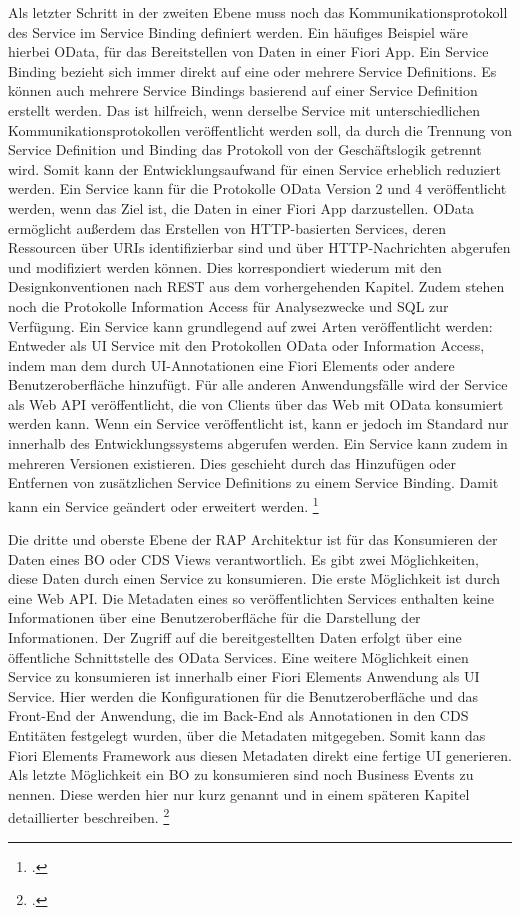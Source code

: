 Als letzter Schritt in der zweiten Ebene muss noch das Kommunikationsprotokoll des Service im Service Binding definiert werden. Ein häufiges Beispiel wäre hierbei OData, für das Bereitstellen von Daten in einer Fiori App. Ein Service Binding bezieht sich immer direkt auf eine oder mehrere Service Definitions. Es können auch mehrere Service Bindings basierend auf einer Service Definition erstellt werden. Das ist \zB hilfreich, wenn derselbe Service mit unterschiedlichen Kommunikationsprotokollen veröffentlicht werden soll, da durch die Trennung von Service Definition und Binding das Protokoll von der Geschäftslogik getrennt wird. Somit kann der Entwicklungsaufwand für einen Service erheblich reduziert werden. Ein Service kann für die Protokolle OData Version 2 und 4 veröffentlicht werden, wenn das Ziel ist, die Daten in einer Fiori App darzustellen. OData ermöglicht au{\ss}erdem das Erstellen von HTTP-basierten Services, deren Ressourcen über URIs identifizierbar sind und über HTTP-Nachrichten abgerufen und modifiziert werden können. Dies korrespondiert wiederum mit den Designkonventionen nach REST aus dem vorhergehenden Kapitel. Zudem stehen noch die Protokolle Information Access für Analysezwecke und SQL zur Verfügung. Ein Service kann grundlegend auf zwei Arten veröffentlicht werden: Entweder als UI Service mit den Protokollen OData oder Information Access, indem man dem durch UI-Annotationen eine Fiori Elements oder andere Benutzeroberfläche hinzufügt. Für alle anderen Anwendungsfälle wird der Service als Web API veröffentlicht, die von Clients über das Web mit OData konsumiert werden kann. Wenn ein Service veröffentlicht ist, kann er jedoch im Standard nur innerhalb des Entwicklungssystems abgerufen werden. Ein Service kann zudem in mehreren Versionen existieren. Dies geschieht durch das Hinzufügen oder Entfernen von zusätzlichen Service Definitions zu einem Service Binding. Damit kann ein Service geändert oder erweitert werden. \footcite[Vgl.][]{sap_rap_2023}

Die dritte und oberste Ebene der RAP Architektur ist für das Konsumieren der Daten eines BO oder CDS Views verantwortlich. Es gibt zwei Möglichkeiten, diese Daten durch einen Service zu konsumieren. Die erste Möglichkeit ist durch eine Web API. Die Metadaten eines so veröffentlichten Services enthalten keine Informationen über eine Benutzeroberfläche für die Darstellung der Informationen. Der Zugriff auf die bereitgestellten Daten erfolgt über eine öffentliche Schnittstelle des OData Services. Eine weitere Möglichkeit einen Service zu konsumieren ist innerhalb einer Fiori Elements Anwendung als UI Service. Hier werden die Konfigurationen für die Benutzeroberfläche und das Front-End der Anwendung, die im Back-End als Annotationen in den CDS Entitäten festgelegt wurden, über die Metadaten mitgegeben. Somit kann das Fiori Elements Framework aus diesen Metadaten direkt eine fertige UI generieren. Als letzte Möglichkeit ein BO zu konsumieren sind noch Business Events zu nennen. Diese werden hier nur kurz genannt und in einem späteren Kapitel detaillierter beschreiben. \footcite[Vgl.][]{sap_rap_2023}

